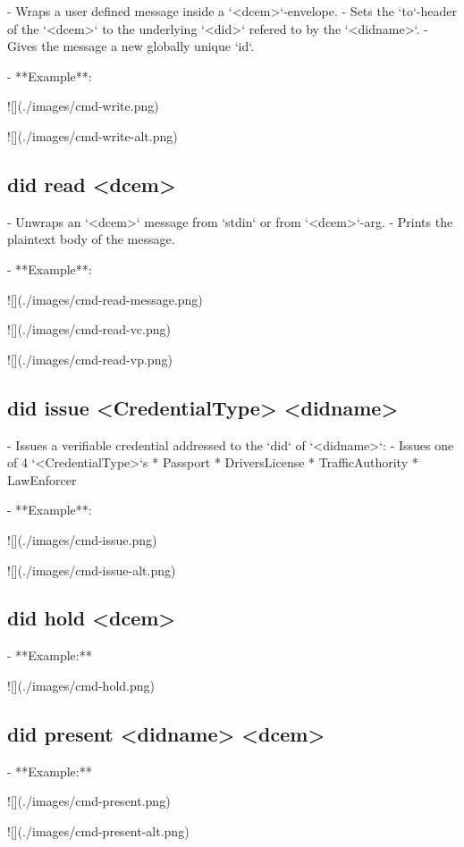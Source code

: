 - Wraps a user defined message inside a `<dcem>`-envelope.
- Sets the `to`-header of the `<dcem>` to the underlying `<did>` refered to by the `<didname>`.
- Gives the message a new globally unique `id`.

- **Example**:

    ![](./images/cmd-write.png)

    ![](./images/cmd-write-alt.png)

\subsection{did read <dcem>}

- Unwraps an `<dcem>` message from `stdin` or from `<dcem>`-arg.
- Prints the plaintext body of the message.

- **Example**:

    ![](./images/cmd-read-message.png)

    ![](./images/cmd-read-vc.png)

    ![](./images/cmd-read-vp.png)


\subsection{did issue <CredentialType> <didname>}

- Issues a verifiable credential addressed to the `did` of `<didname>`:
- Issues one of 4 `<CredentialType>`s
    * Passport
    * DriversLicense
    * TrafficAuthority
    * LawEnforcer

- **Example**:

    ![](./images/cmd-issue.png)

    ![](./images/cmd-issue-alt.png)


\subsection{did hold <dcem>}

- **Example:**

    ![](./images/cmd-hold.png)

\subsection{did present <didname> <dcem>}

- **Example:**

    ![](./images/cmd-present.png)

    ![](./images/cmd-present-alt.png)

